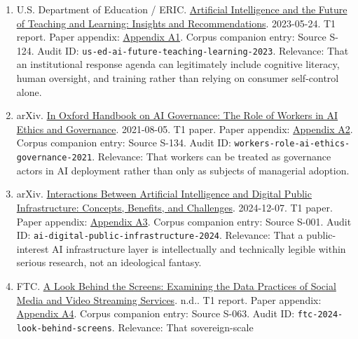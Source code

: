\documentclass[
  american,
  11pt,
  letterpaper,
]{article}
\providecommand{\tightlist}{%
  \setlength{\itemsep}{0pt}\setlength{\parskip}{0pt}}
\begin{document}
\begin{enumerate}
\def\labelenumi{\arabic{enumi}.}
\tightlist
\item
  U.S. Department of Education / ERIC.
  \href{https://eric.ed.gov/?id=ED631097}{Artificial Intelligence and
  the Future of Teaching and Learning: Insights and Recommendations}.
  2023-05-24. T1 report. Paper appendix:
  \hyperref[appendix-a1-artificial-intelligence-and-the-future-of-teaching-and-learning-insights-and-recommendations]{Appendix
  A1}. Corpus companion entry: Source S-124. Audit ID:
  \texttt{us-ed-ai-future-teaching-learning-2023}. Relevance: That an
  institutional response agenda can legitimately include cognitive
  literacy, human oversight, and training rather than relying on
  consumer self-control alone.
\item
  arXiv. \href{https://arxiv.org/abs/2108.07700}{In Oxford Handbook on
  AI Governance: The Role of Workers in AI Ethics and Governance}.
  2021-08-05. T1 paper. Paper appendix:
  \hyperref[appendix-a2-in-oxford-handbook-on-ai-governance-the-role-of-workers-in-ai-ethics-and-governance]{Appendix
  A2}. Corpus companion entry: Source S-134. Audit ID:
  \texttt{workers-role-ai-ethics-governance-2021}. Relevance: That
  workers can be treated as governance actors in AI deployment rather
  than only as subjects of managerial adoption.
\item
  arXiv. \href{https://arxiv.org/abs/2412.05761}{Interactions Between
  Artificial Intelligence and Digital Public Infrastructure: Concepts,
  Benefits, and Challenges}. 2024-12-07. T1 paper. Paper appendix:
  \hyperref[appendix-a3-interactions-between-artificial-intelligence-and-digital-public-infrastructure-concepts-benefits-and-challenges]{Appendix
  A3}. Corpus companion entry: Source S-001. Audit ID:
  \texttt{ai-digital-public-infrastructure-2024}. Relevance: That a
  public-interest AI infrastructure layer is intellectually and
  technically legible within serious research, not an ideological
  fantasy.
\item
  FTC.
  \href{https://www.ftc.gov/reports/look-behind-screens-examining-data-practices-social-media-video-streaming-services}{A
  Look Behind the Screens: Examining the Data Practices of Social Media
  and Video Streaming Services}. n.d.. T1 report. Paper appendix:
  \hyperref[appendix-a4-a-look-behind-the-screens-examining-the-data-practices-of-social-media-and-video-streaming-services]{Appendix
  A4}. Corpus companion entry: Source S-063. Audit ID:
  \texttt{ftc-2024-look-behind-screens}. Relevance: That sovereign-scale

\end{enumerate}
\end{document}
